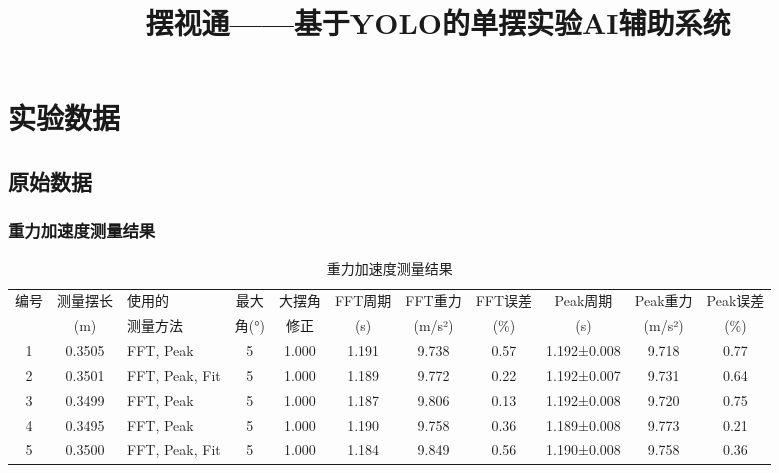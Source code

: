 \documentclass[lang=cn,a4paper,newtx,bibstyle=gb7714-2015]{elegantpaper}
\title{摆视通——基于YOLO的单摆实验AI辅助系统}
\date{}
\institute{第十一届湖北省大学生物理实验创新设计竞赛}
\newcommand{\threelinetablestyle}{%
  \renewcommand{\arraystretch}{1.2}%
  \setlength{\tabcolsep}{3.5pt}%
  \small%
}
\numberwithin{equation}{section} %
\begin{document}
\fancyhf{} %


\newpage


\newpage
\tableofcontents


\fancyhead[R]{\kaishu \leftmark}
\renewcommand{\headrulewidth}{0.4pt} %
\fancyfoot[C]{\thepage}
\newpage
{} %
\pagestyle{fancy}  %












\nocite{*}
\printbibliography[heading=bibintoc, title=\ebibname]

\appendix
\appendixpage
\addappheadtotoc

\section{实验数据}
\subsection{原始数据}

\subsubsection{重力加速度测量结果}
\begin{table}[H]
\centering
\threelinetablestyle
\caption{重力加速度测量结果}
\setlength{\tabcolsep}{3pt}
\footnotesize
\begin{tabular}{cclcccccccc}
\toprule
编号 & 测量摆长 & 使用的 & 最大 & 大摆角 & FFT周期 & FFT重力 & FFT误差 & Peak周期 & Peak重力 & Peak误差 \\
 & (m) & 测量方法 & 角(°) & 修正 & (s) & (m/s²) & (\%) & (s) & (m/s²) & (\%) \\
\midrule
1 & 0.3505 & FFT, Peak & 5 & 1.000 & 1.191 & 9.738 & 0.57 & 1.192±0.008 & 9.718 & 0.77 \\
2 & 0.3501 & FFT, Peak, Fit & 5 & 1.000 & 1.189 & 9.772 & 0.22 & 1.192±0.007 & 9.731 & 0.64 \\
3 & 0.3499 & FFT, Peak & 5 & 1.000 & 1.187 & 9.806 & 0.13 & 1.192±0.008 & 9.720 & 0.75 \\
4 & 0.3495 & FFT, Peak & 5 & 1.000 & 1.190 & 9.758 & 0.36 & 1.189±0.008 & 9.773 & 0.21 \\
5 & 0.3500 & FFT, Peak, Fit & 5 & 1.000 & 1.184 & 9.849 & 0.56 & 1.190±0.008 & 9.758 & 0.36 \\
\bottomrule
\end{tabular}
\label{tab:gravity_measurement}
\end{table}
\label{app:gravity_measurement}
\end{document}
